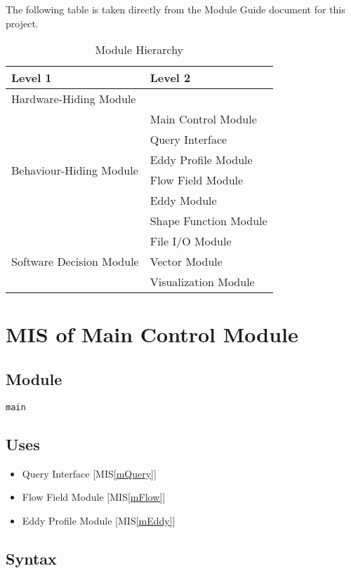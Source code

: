 \documentclass[12pt, titlepage]{article}
\begin{document}
The following table is taken directly from the Module Guide document for this project.
\begin{table}[h!]
  \centering
  \begin{tabular}{p{} p{}}
  \toprule
  \textbf{Level 1} & \textbf{Level 2}\\
  \midrule
  
  {Hardware-Hiding Module} & ~ \\
  \midrule
  
  \multirow{6}{0.3\textwidth}{Behaviour-Hiding Module}
  & Main Control Module\\
  & Query Interface\\
  & Eddy Profile Module\\
  & Flow Field Module\\
  & Eddy Module\\
  & Shape Function Module\\
  \midrule
  
  \multirow{3}{0.3\textwidth}{Software Decision Module} 
  & File I/O Module\\
  & Vector Module\\
  & Visualization Module\\
  \bottomrule

\end{tabular}
\caption{Module Hierarchy}
\label{TblMH}
\end{table}

\newpage
\section{MIS of Main Control Module} \label{mMain} 

\subsection{Module}
\texttt{main}

\subsection{Uses}
\begin{itemize}
\item Query Interface [MIS\ref{mQuery}]
\item Flow Field Module [MIS\ref{mFlow}]
\item Eddy Profile Module [MIS\ref{mEddy}]
\end{itemize}

\subsection{Syntax}
\end{document}
